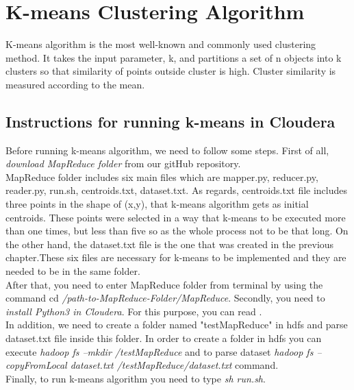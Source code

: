 
\chapter{K-means Clustering Algorithm} %

K-means algorithm is the most well-known and commonly used clustering
method. It takes the input parameter, k, and partitions a set of n objects into
k clusters so that similarity of points outside cluster is high. Cluster similarity is measured according to the mean.

\label{Chapter3} %


\section{Instructions for running k-means in Cloudera}
Before running k-means algorithm, we need to follow some steps. First of all, \textit{download MapReduce folder} from our gitHub repository.\\
MapReduce folder includes six main files which are mapper.py, reducer.py, reader.py, run.sh, centroids.txt, dataset.txt. As regards, centroids.txt file includes three points in the shape of (x,y), that k-means algorithm gets as initial centroids. These points were selected in a way that k-means to be executed more than one times, but less than five so as the whole process not to be that long. On the other hand,  the dataset.txt file is the one that was created in the previous chapter.These six files are necessary for k-means to be implemented and they are needed to be in the same folder. \\
After that, you need to enter MapReduce folder from terminal by using the command cd \textit{/path-to-MapReduce-Folder/MapReduce}.
Secondly, you need to \textit{install Python3 in Cloudera}. For this purpose, you can read \cite{Python3Cloudera}.\\
In addition, we need to create a folder named "testMapReduce" in hdfs and parse dataset.txt file inside this folder. In order to create a folder in hdfs you can execute \textit{hadoop fs –mkdir /testMapReduce} and to parse dataset \textit{hadoop fs –copyFromLocal dataset.txt /testMapReduce/dataset.txt} command.\\
Finally, to run k-means algorithm you need to type \textit{sh run.sh}.

